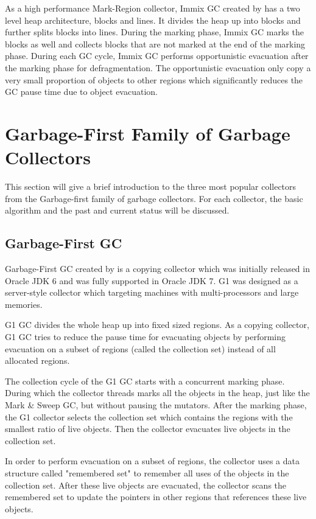 As a high performance Mark-Region collector, Immix GC created by \cite{blackburn2008immix}
has a two level heap architecture, blocks and lines. It divides the heap up into blocks and
further splits blocks into lines. During the marking phase, Immix GC marks the blocks
as well and collects blocks that are not marked at the end of the marking phase.
During each GC cycle, Immix GC performs opportunistic evacuation after the marking phase for defragmentation.
The opportunistic evacuation only copy a very small proportion of objects to other regions which significantly
reduces the GC pause time due to object evacuation.

\section{Garbage-First Family of Garbage Collectors}
\label{sec:g1collectors}

This section will give a brief introduction to the three most popular collectors from the Garbage-first
family of garbage collectors. For each collector, the basic algorithm
and the past and current status will be discussed.

\subsection{Garbage-First GC}

Garbage-First GC created by \cite{detlefs2004garbage} is a copying collector which was initially released in Oracle JDK 6
and was fully supported in Oracle JDK 7. G1 was designed as a server-style collector
which targeting machines with multi-processors and large memories. 

G1 GC divides the whole heap up into fixed sized regions. 
As a copying collector, G1 GC tries to reduce the pause time for evacuating objects
by performing evacuation on a subset of regions (called the collection set) instead of
all allocated regions.

The collection cycle of the G1 GC starts with a concurrent marking phase.
During which the collector threads marks all the objects in the heap, just like the Mark \&
Sweep GC, but without pausing the mutators.
After the marking phase, the G1 collector selects the collection set which contains
the regions with the smallest ratio of live objects.
Then the collector evacuates live objects in the collection set.

In order to perform evacuation on a subset of regions, the collector uses a data structure
called "remembered set" to remember all uses of the objects in the collection set.
After these live objects are evacuated, the collector scans the remembered set to
update the pointers in other regions that references these live objects.

